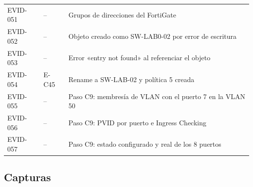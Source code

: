 \documentclass[11pt,a4paper]{article}
\begin{document}
{\begin{longtable}{L{1.6cm} L{1.8cm} L{11.9cm}}
  EVID-051 & -- & Grupos de direcciones del FortiGate\\
  EVID-052 & -- & Objeto creado como SW-LAB0-02 por error de escritura\\
  EVID-053 & -- & Error «entry not found» al referenciar el objeto\\
  EVID-054 & E-C45 & Rename a SW-LAB-02 y política 5 creada\\
  EVID-055 & -- & Paso C9: membresía de VLAN con el puerto 7 en la VLAN 50\\
  EVID-056 & -- & Paso C9: PVID por puerto e Ingress Checking\\
  EVID-057 & -- & Paso C9: estado configurado y real de los 8 puertos\\
  \bottomrule
\end{longtable}
}

\subsection*{Capturas}
\end{document}
